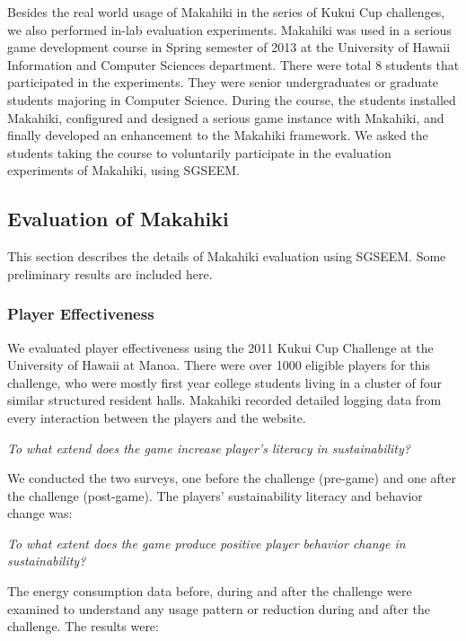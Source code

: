 \documentclass{sigchi}
\begin{document}
Besides the real world usage of Makahiki in the series of Kukui Cup challenges, we also
performed in-lab evaluation experiments. Makahiki was used in a serious game development
course in Spring semester of 2013 at the University of Hawaii Information and Computer Sciences department. There
were total 8 students that participated in the experiments. They were senior undergraduates
 or graduate students majoring in Computer Science. During the course, the students
installed Makahiki, configured and designed a serious game instance with Makahiki, and
finally developed an enhancement to the Makahiki framework. We asked the students taking
the course to voluntarily participate in the evaluation experiments of Makahiki, using
SGSEEM.

\subsection{Evaluation of Makahiki}

This section describes the details of Makahiki evaluation using SGSEEM. Some preliminary results are included here.

\subsubsection{Player Effectiveness}

We evaluated player effectiveness using the 2011 Kukui Cup Challenge at
the University of Hawaii at Manoa. There were over 1000 eligible players
for this challenge, who were mostly first year college students living
in a cluster of four similar structured resident halls. Makahiki
recorded detailed logging data from every interaction between the
players and the website.

\emph{To what extend does the game increase player's literacy in
  sustainability?}

We conducted the two surveys, one before the challenge (pre-game) and
one after the challenge (post-game). The players' sustainability
literacy and behavior change was:

\emph{To what extent does the game produce positive player behavior
  change in sustainability?}

The energy consumption data before, during and after the challenge were
examined to understand any usage pattern or reduction during and after
the challenge. The results were:
\end{document}
